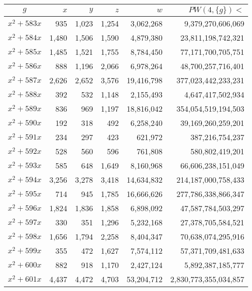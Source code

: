\documentclass{article}
\begin{document}
\begin{center}
\begin{tabular}{ | c | r | r | r | r | r | }
$g$ & $x$ & $y$ & $z$ & $w$ & $PW(4, \{g\}) <$ \\ \hline
$x^2 + 583x$ & 935 & 1{,}023 & 1{,}254 & 3{,}062{,}268 & 9{,}379{,}270{,}606{,}069 \\ \hline
$x^2 + 584x$ & 1{,}480 & 1{,}506 & 1{,}590 & 4{,}879{,}380 & 23{,}811{,}198{,}742{,}321 \\ \hline
$x^2 + 585x$ & 1{,}485 & 1{,}521 & 1{,}755 & 8{,}784{,}450 & 77{,}171{,}700{,}705{,}751 \\ \hline
$x^2 + 586x$ & 888 & 1{,}196 & 2{,}066 & 6{,}978{,}264 & 48{,}700{,}257{,}716{,}401 \\ \hline
$x^2 + 587x$ & 2{,}626 & 2{,}652 & 3{,}576 & 19{,}416{,}798 & 377{,}023{,}442{,}233{,}231 \\ \hline
$x^2 + 588x$ & 392 & 532 & 1{,}148 & 2{,}155{,}493 & 4{,}647{,}417{,}502{,}934 \\ \hline
$x^2 + 589x$ & 836 & 969 & 1{,}197 & 18{,}816{,}042 & 354{,}054{,}519{,}194{,}503 \\ \hline
$x^2 + 590x$ & 192 & 318 & 492 & 6{,}258{,}240 & 39{,}169{,}260{,}259{,}201 \\ \hline
$x^2 + 591x$ & 234 & 297 & 423 & 621{,}972 & 387{,}216{,}754{,}237 \\ \hline
$x^2 + 592x$ & 528 & 560 & 596 & 761{,}808 & 580{,}802{,}419{,}201 \\ \hline
$x^2 + 593x$ & 585 & 648 & 1{,}649 & 8{,}160{,}968 & 66{,}606{,}238{,}151{,}049 \\ \hline
$x^2 + 594x$ & 3{,}256 & 3{,}278 & 3{,}418 & 14{,}634{,}832 & 214{,}187{,}000{,}758{,}433 \\ \hline
$x^2 + 595x$ & 714 & 945 & 1{,}785 & 16{,}666{,}626 & 277{,}786{,}338{,}866{,}347 \\ \hline
$x^2 + 596x$ & 1{,}824 & 1{,}836 & 1{,}858 & 6{,}898{,}092 & 47{,}587{,}784{,}503{,}297 \\ \hline
$x^2 + 597x$ & 330 & 351 & 1{,}296 & 5{,}232{,}168 & 27{,}378{,}705{,}584{,}521 \\ \hline
$x^2 + 598x$ & 1{,}656 & 1{,}794 & 2{,}258 & 8{,}404{,}347 & 70{,}638{,}074{,}295{,}916 \\ \hline
$x^2 + 599x$ & 355 & 472 & 1{,}627 & 7{,}574{,}112 & 57{,}371{,}709{,}481{,}633 \\ \hline
$x^2 + 600x$ & 882 & 918 & 1{,}170 & 2{,}427{,}124 & 5{,}892{,}387{,}185{,}777 \\ \hline
$x^2 + 601x$ & 4{,}437 & 4{,}472 & 4{,}703 & 53{,}204{,}712 & 2{,}830{,}773{,}355{,}034{,}857 \\ \hline

\end{tabular}
\end{center}
\end{document}

